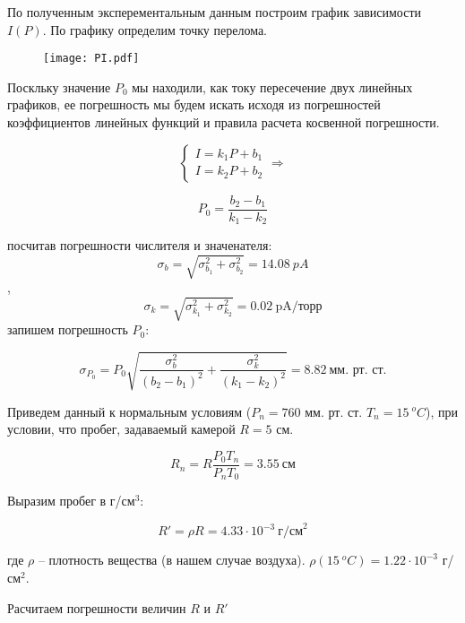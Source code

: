     

    По полученным эксперементальным данным построим график зависимости $I(P)$. По графику определим точку перелома.

    \begin{figure}
        \centering
        \texttt{[image: PI.pdf]}
        \caption{}
        \label{fig:1}
    \end{figure}
    
    Поскльку значение $P_0$ мы находили, как току пересечение двух линейных графиков, ее погрешность
    мы будем искать исходя из погрешностей коэффициентов линейных функций и правила расчета косвенной погрешности.

    \begin{equation*}
        \begin{cases}
            I = k_1 P + b_1 \\
            I = k_2 P + b_2
        \end{cases}
        \Rightarrow
    \end{equation*}

    \[ P_0 = \frac{b_2 - b_1}{k_1 - k_2} \]

    посчитав погрешности числителя и значенателя: 
    $$\sigma_b = \sqrt{\sigma_{b_1}^2 + \sigma_{b_2}^2} = 14.08 ~ pA$$,
    $$\sigma_k = \sqrt{\sigma_{k_1}^2 + \sigma_{k_2}^2} = 0.02 ~ \text{pA/торр}$$ 
    запишем погрешность $P_0$:

    \[ \sigma_{P_0} = P_0 \sqrt{\frac{\sigma_b^2}{(b_2 - b_1)^2} + \frac{\sigma_k^2}{(k_1 - k_2)^2}} = 8.82 ~ \text{мм. рт. ст.} \]

    \begin{center}
    \end{center}

    Приведем данный к нормальным условиям ($P_n = 760$ мм. рт. ст. $T_n = 15 ~ ^oC$), при условии,
    что пробег, задаваемый камерой $R = 5$ см.

    \[ R_n = R \frac{P_0 T_n}{P_n T_0} = 3.55 ~ \text{см} \]

    Выразим пробег в г/см$^3$:

    \[ R' = \rho R = 4.33 \cdot 10^{-3} ~ \text{г/см}^2 \]

    где $\rho$ -- плотность вещества (в нашем случае воздуха). $\rho(15 ~ ^oC) = 1.22 \cdot 10^{-3}$ г/см$^2$.

    Расчитаем погрешности величин $R$ и $R'$

